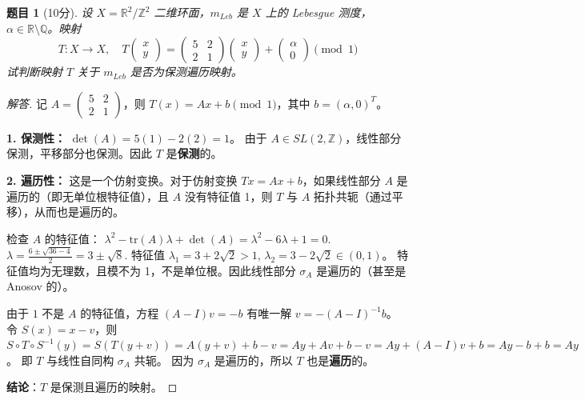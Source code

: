 \documentclass[a4paper,12pt]{article}
\newtheorem{problem}{题目}
\newenvironment{solution}{\begin{proof}[解答]}{\end{proof}}
\begin{document}
\begin{problem}[10分]
    设 $X = \mathbb{R}^2/\mathbb{Z}^2$ 二维环面，$m_{Leb}$ 是 $X$ 上的 Lebesgue 测度，$\alpha \in \mathbb{R} \setminus \mathbb{Q}$。映射
    $$
    T: X \to X, \quad T\begin{pmatrix} x \\ y \end{pmatrix} = \begin{pmatrix} 5 & 2 \\ 2 & 1 \end{pmatrix} \begin{pmatrix} x \\ y \end{pmatrix} + \begin{pmatrix} \alpha \\ 0 \end{pmatrix} \pmod 1
    $$
    试判断映射 $T$ 关于 $m_{Leb}$ 是否为保测遍历映射。
\end{problem}

\begin{solution}
    记 $A = \begin{pmatrix} 5 & 2 \\ 2 & 1 \end{pmatrix}$，则 $T(x) = Ax + b \pmod 1$，其中 $b = (\alpha, 0)^T$。
    
    \textbf{1. 保测性：}
    $\det(A) = 5(1) - 2(2) = 1$。
    由于 $A \in SL(2, \mathbb{Z})$，线性部分保测，平移部分也保测。因此 $T$ 是\textbf{保测}的。

    \textbf{2. 遍历性：}
    这是一个仿射变换。对于仿射变换 $Tx = Ax + b$，如果线性部分 $A$ 是遍历的（即无单位根特征值），且 $A$ 没有特征值 1，则 $T$ 与 $A$ 拓扑共轭（通过平移），从而也是遍历的。
    
    检查 $A$ 的特征值：
    $\lambda^2 - \text{tr}(A)\lambda + \det(A) = \lambda^2 - 6\lambda + 1 = 0$.
    $\lambda = \frac{6 \pm \sqrt{36-4}}{2} = 3 \pm \sqrt{8}$.
    特征值 $\lambda_1 = 3 + 2\sqrt{2} > 1$, $\lambda_2 = 3 - 2\sqrt{2} \in (0, 1)$。
    特征值均为无理数，且模不为 1，不是单位根。因此线性部分 $\sigma_A$ 是遍历的（甚至是 Anosov 的）。
    
    由于 $1$ 不是 $A$ 的特征值，方程 $(A-I)v = -b$ 有唯一解 $v = -(A-I)^{-1}b$。
    令 $S(x) = x - v$，则 $S \circ T \circ S^{-1}(y) = S(T(y+v)) = A(y+v) + b - v = Ay + Av + b - v = Ay + (A-I)v + b = Ay - b + b = Ay$。
    即 $T$ 与线性自同构 $\sigma_A$ 共轭。
    因为 $\sigma_A$ 是遍历的，所以 $T$ 也是\textbf{遍历}的。
    
    \textbf{结论}：$T$ 是保测且遍历的映射。
\end{solution}
\end{document}
